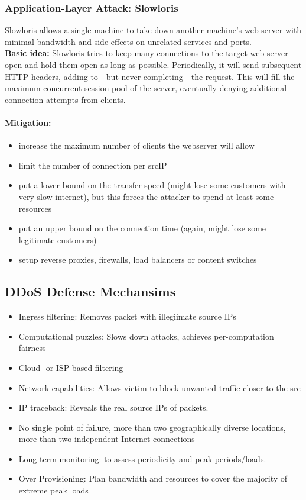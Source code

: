 \subsubsection{Application-Layer Attack: Slowloris}
Slowloris allows a single machine to take down another machine's web server with minimal bandwidth and side effects on unrelated services and ports.\\
\textbf{Basic idea:} Slowloris tries to keep many connections to the target web server open and hold them open as long as possible. Periodically, it will send subsequent HTTP headers, adding to - but never completing - the request. This will fill the maximum concurrent session pool of the server, eventually denying additional connection attempts from clients.\\

\paragraph{Mitigation:}
\begin{itemize}
	\item increase the maximum number of clients the webserver will allow
	\item limit the number of connection per srcIP
	\item put a lower bound on the transfer speed (might lose some customers with very slow internet), but this forces the attacker to spend at least some resources
	\item put an upper bound on the connection time (again, might lose some legitimate customers)
	\item setup reverse proxies, firewalls, load balancers or content switches
\end{itemize}

\subsection{DDoS Defense Mechansims}
\begin{itemize}
    \item Ingress filtering: Removes packet with illegiimate source IPs
    \item Computational puzzles: Slows down attacks, achieves per-computation fairness
    \item Cloud- or ISP-based filtering
    \item Network capabilities: Allows victim to block unwanted traffic closer to the src
    \item IP traceback: Reveals the real source IPs of packets.
    \item No single point of failure, more than two geographically diverse locations, more than two independent Internet connections
    \item Long term monitoring: to assess periodicity and peak periods/loads.
    \item Over Provisioning: Plan bandwidth and resources to cover the majority of extreme peak loads
\end{itemize}

